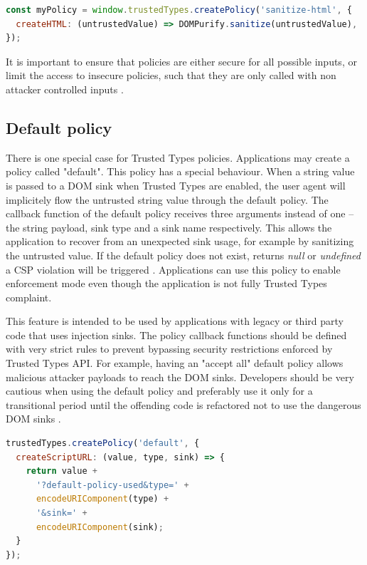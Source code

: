 \bigskip
\begin{lstlisting}[language=JavaScript, caption=Using a policy to sanitize HTML values]
const myPolicy = window.trustedTypes.createPolicy('sanitize-html', {
  createHTML: (untrustedValue) => DOMPurify.sanitize(untrustedValue),
});
\end{lstlisting}

It is important to ensure that policies are either secure for all possible inputs, or limit the
access to insecure policies, such that they are only called with non attacker controlled inputs
\cite{tt_spec:best_practice_policy}.

\subsection{Default policy}

There is one special case for Trusted Types policies. Applications may create a policy called
"default". This policy has a special behaviour. When a string value is passed to a DOM sink when
Trusted Types are enabled, the user agent will implicitely flow the untrusted string value through
the default policy. The callback function of the default policy receives three arguments instead of
one -- the string payload, sink type and a sink name respectively. This allows the application to
recover from an unexpected sink usage, for example by sanitizing the untrusted value. If the default
policy does not exist, returns \textit{null} or \textit{undefined} a CSP violation will be triggered
\cite{tt_spec:default_policy}. Applications can use this policy to enable enforcement mode even
though the application is not fully Trusted Types complaint.

This feature is intended to be used by applications with legacy or third party code that uses
injection sinks. The policy callback functions should be defined with very strict rules to prevent
bypassing security restrictions enforced by Trusted Types API. For example, having an "accept all"
default policy allows malicious attacker payloads to reach the DOM sinks. Developers should be very
cautious when using the default policy and preferably use it only for a transitional period until
the offending code is refactored not to use the dangerous DOM sinks \cite{tt_spec:default_policy}.

\bigskip
\begin{lstlisting}[language=JavaScript, caption=Creating a default policy \cite{tt_spec:default_policy}]
trustedTypes.createPolicy('default', {
  createScriptURL: (value, type, sink) => {
    return value +
      '?default-policy-used&type=' +
      encodeURIComponent(type) +
      '&sink=' +
      encodeURIComponent(sink);
  }
});
\end{lstlisting}

